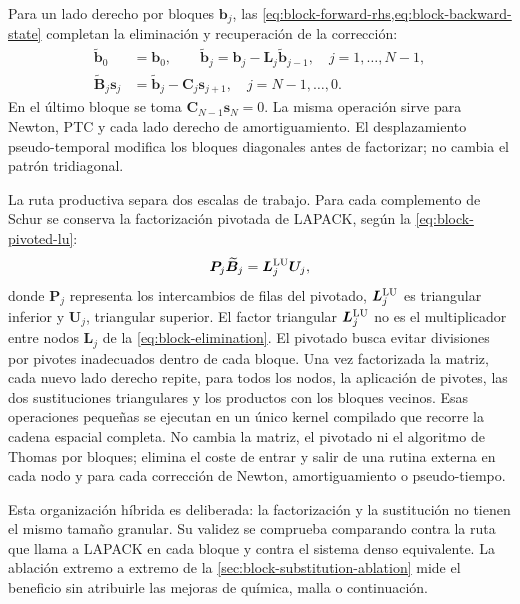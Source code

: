 \documentclass[12pt,a4paper,twoside,openany]{book}
\newcommand{\vect}[1]{\bm{#1}}
\newcommand{\mat}[1]{\bm{#1}}
\begin{document}
Para un lado derecho por bloques \(\vect b_j\), las
\cref{eq:block-forward-rhs,eq:block-backward-state} completan la eliminación
y recuperación de la corrección:
\begin{align}
 \widetilde{\vect b}_0&=\vect b_0,\qquad
 \widetilde{\vect b}_j=\vect b_j-\mat L_j\widetilde{\vect b}_{j-1},
 \quad j=1,\ldots,N-1,
 \label{eq:block-forward-rhs}\\
 \widetilde{\mat B}_j\vect s_j
 &=\widetilde{\vect b}_j-\mat C_j\vect s_{j+1},
 \quad j=N-1,\ldots,0.
 \label{eq:block-backward-state}
\end{align}
En el último bloque se toma \(\mat C_{N-1}\vect s_N=0\). La misma operación
sirve para Newton, PTC y cada lado derecho de amortiguamiento.
El desplazamiento pseudo-temporal modifica los bloques diagonales antes de
factorizar; no cambia el patrón tridiagonal.

La ruta productiva separa dos escalas de trabajo. Para cada complemento de Schur
se conserva la factorización pivotada de LAPACK, según la \cref{eq:block-pivoted-lu}:
\begin{equation}
  \mat P_j\widetilde{\mat B}_j=\mat L_j^{\rm LU}\mat U_j,
  \label{eq:block-pivoted-lu}
\end{equation}
donde \(\mat P_j\) representa los intercambios de filas del pivotado,
\(\mat L_j^{\rm LU}\) es triangular inferior y \(\mat U_j\), triangular
superior. El factor triangular \(\mat L_j^{\rm LU}\) no es el multiplicador
entre nodos \(\mat L_j\) de la \cref{eq:block-elimination}. El pivotado busca
evitar divisiones por pivotes inadecuados dentro de cada bloque. Una vez factorizada la matriz, cada nuevo
lado derecho repite, para todos los nodos, la aplicación de pivotes, las dos
sustituciones triangulares y los productos con los bloques vecinos. Esas
operaciones pequeñas se ejecutan en un único kernel compilado que recorre la
cadena espacial completa. No cambia la matriz, el pivotado ni el algoritmo de
Thomas por bloques; elimina el coste de entrar y salir de una rutina externa en
cada nodo y para cada corrección de Newton, amortiguamiento o pseudo-tiempo.

Esta organización híbrida es deliberada: la factorización y la sustitución no
tienen el mismo tamaño granular. Su validez se comprueba comparando contra la
ruta que llama a LAPACK en cada bloque y contra el sistema denso equivalente.
La ablación extremo a extremo de la \cref{sec:block-substitution-ablation} mide el
beneficio sin atribuirle las mejoras de química, malla o continuación.
\end{document}
